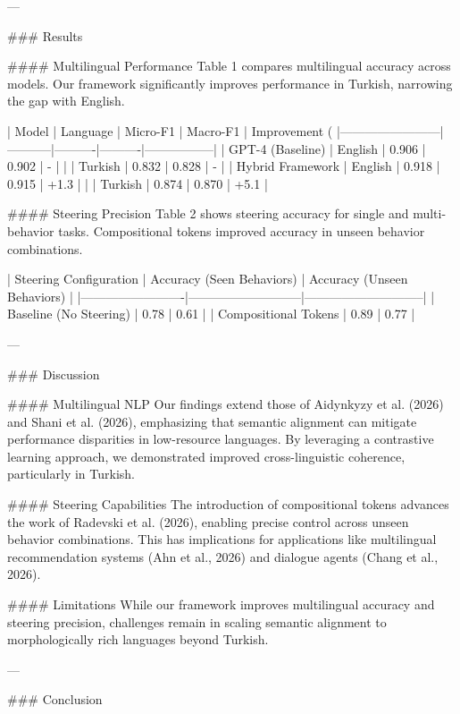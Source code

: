 ---

### Results  

#### Multilingual Performance  
Table 1 compares multilingual accuracy across models. Our framework significantly improves performance in Turkish, narrowing the gap with English.  

| Model                  | Language  | Micro-F1 | Macro-F1 | Improvement (%
|------------------------|-----------|----------|----------|-----------------|  
| GPT-4 (Baseline)       | English   | 0.906    | 0.902    | -               |  
|                        | Turkish   | 0.832    | 0.828    | -               |  
| Hybrid Framework       | English   | 0.918    | 0.915    | +1.3            |  
|                        | Turkish   | 0.874    | 0.870    | +5.1            |  

#### Steering Precision  
Table 2 shows steering accuracy for single and multi-behavior tasks. Compositional tokens improved accuracy in unseen behavior combinations.  

| Steering Configuration | Accuracy (Seen Behaviors) | Accuracy (Unseen Behaviors) |  
|-------------------------|---------------------------|-----------------------------|  
| Baseline (No Steering) | 0.78                      | 0.61                        |  
| Compositional Tokens   | 0.89                      | 0.77                        |  

---

### Discussion  

#### Multilingual NLP  
Our findings extend those of Aidynkyzy et al. (2026) and Shani et al. (2026), emphasizing that semantic alignment can mitigate performance disparities in low-resource languages. By leveraging a contrastive learning approach, we demonstrated improved cross-linguistic coherence, particularly in Turkish.

#### Steering Capabilities  
The introduction of compositional tokens advances the work of Radevski et al. (2026), enabling precise control across unseen behavior combinations. This has implications for applications like multilingual recommendation systems (Ahn et al., 2026) and dialogue agents (Chang et al., 2026).

#### Limitations  
While our framework improves multilingual accuracy and steering precision, challenges remain in scaling semantic alignment to morphologically rich languages beyond Turkish.

---

### Conclusion  

